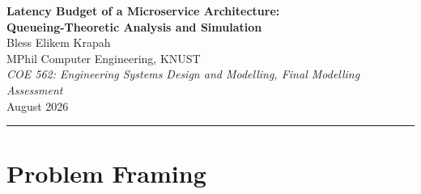 \documentclass[12pt,a4paper]{article}
\newcommand{\rr}{\rho}
\begin{document}
\begin{center}
  {\LARGE\bfseries Latency Budget of a Microservice Architecture:\\[4pt]
  Queueing-Theoretic Analysis and Simulation}\\[14pt]
  {\large Bless Elikem Krapah}\\[4pt]
  {\normalsize MPhil Computer Engineering, KNUST}\\[4pt]
  {\small\textit{COE 562: Engineering Systems Design and Modelling,
  Final Modelling Assessment}}\\[6pt]
  {\small August 2026}
\end{center}
\rule{\textwidth}{0.4pt}
\vspace{4mm}

\begin{abstract}
\noindent
A four-stage microservice pipeline (API Gateway, Authentication, Business Logic, Database)
is modelled as an open tandem queueing network to analyse its latency behaviour under a
target arrival rate of \SI{200}{req/s}. Analytic treatment using Jackson's theorem and the
M/M/1 model reveals that both the Business (\(\rr = 1.60\)) and Database (\(\rr = 2.40\))
stages are saturated at the given load, making the system unstable. The primary bottleneck
is the Database stage with a maximum throughput of \SI{83.3}{req/s}. A discrete-event
simulation with SimPy validates the analytic model via Little's Law and reveals that
lognormal service-time distributions (CV\,=\,2, realistic for databases) increase the
95th-percentile end-to-end latency from \SI{112}{ms} to \SI{312}{ms} at \(\lambda =
\SI{50}{req/s}\), a 2.8-fold underestimate from the M/M/1 assumption. Two equal-cost
capacity strategies are evaluated: replicating bottleneck stages (M/M/N) achieves a mean
end-to-end latency of \SI{32.5}{ms}, whereas an equivalent speedup investment (M/M/1 with
higher throughput) achieves \SI{22.0}{ms} at \(\lambda = \SI{200}{req/s}\). Strategy B is preferred: a single fast server has less queuing variance than multiple
slower ones at the same per-server utilisation.
\end{abstract}

\tableofcontents
\newpage

\section{Problem Framing}
\label{sec:framing}
\end{document}
